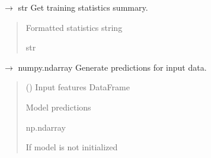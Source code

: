 \documentclass[letterpaper,10pt,english]{sphinxmanual}
\begin{document}
\begin{fulllineitems}
\label{\detokenize{autoapi/src/RandomForestTrainer/index:src.RandomForestTrainer.stats}}
\pysigstartsignatures
\pysiglinewithargsret
{}
{}
{{ $\rightarrow$ str}}
\pysigstopsignatures
\sphinxAtStartPar
Get training statistics summary.
\begin{quote}\begin{description}
\sphinxAtStartPar
Formatted statistics string

\sphinxAtStartPar
str

\end{description}\end{quote}

\end{fulllineitems}


\begin{fulllineitems}
\label{\detokenize{autoapi/src/RandomForestTrainer/index:src.RandomForestTrainer.predict}}
\pysigstartsignatures
\pysiglinewithargsret
{}
{}
{{ $\rightarrow$ numpy.ndarray}}
\pysigstopsignatures
\sphinxAtStartPar
Generate predictions for input data.
\begin{quote}\begin{description}
\sphinxAtStartPar
{} () \textendash{} Input features DataFrame

\sphinxAtStartPar
Model predictions

\sphinxAtStartPar
np.ndarray

\sphinxAtStartPar
{} \textendash{} If model is not initialized

\end{description}\end{quote}

\end{fulllineitems}
\end{document}
